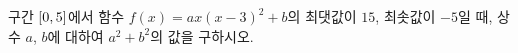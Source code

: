 구간 $[0{,}\mkern3mu\mathopen{}5]$에서 함수 $f(x)=ax(x-3)^2+b$의 최댓값이 $15$, 최솟값이 $-5$일 때, 상수 $a$, $b$에 대하여 $a^2+b^2$의 값을 구하시오. 
